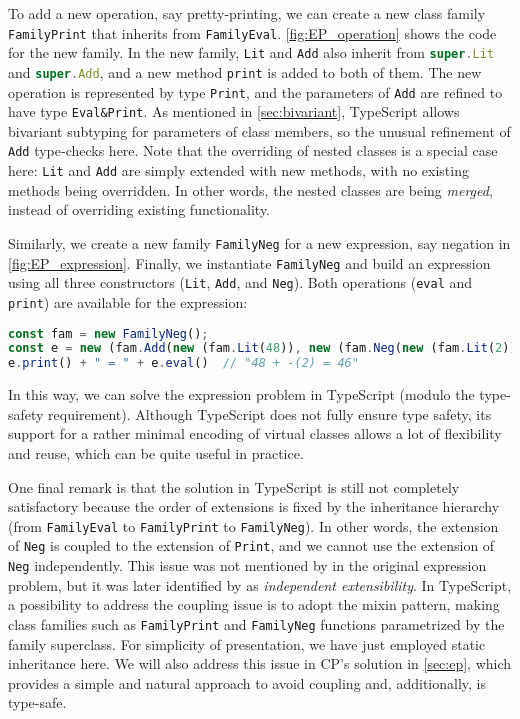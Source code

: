 To add a new operation, say pretty-printing, we can create a new class family
\lstinline{FamilyPrint} that inherits from \lstinline{FamilyEval}.
\autoref{fig:EP_operation} shows the code for the new family. In the new family,
\lstinline{Lit} and \lstinline{Add} also inherit from
\lstinline[language=TypeScript]{super.Lit} and
\lstinline[language=TypeScript]{super.Add}, and a new method \lstinline{print}
is added to both of them. The new operation is represented by type
\lstinline{Print}, and the parameters of \lstinline{Add} are refined to have
type \lstinline{Eval&Print}. As mentioned in \autoref{sec:bivariant}, TypeScript
allows bivariant subtyping for parameters of class members, so the unusual
refinement of \lstinline{Add} type-checks here. Note that the overriding of
nested classes is a special case here: \lstinline{Lit} and \lstinline{Add} are
simply extended with new methods, with no existing methods being overridden. In
other words, the nested classes are being \emph{merged}, instead of overriding
existing functionality.

Similarly, we create a new family \lstinline{FamilyNeg} for a new expression,
say negation in \autoref{fig:EP_expression}. Finally, we instantiate
\lstinline{FamilyNeg} and build an expression using all three constructors
(\lstinline{Lit}, \lstinline{Add}, and \lstinline{Neg}). Both operations
(\lstinline{eval} and \lstinline{print}) are available for the expression:
\begin{lstlisting}[language=TypeScript]
const fam = new FamilyNeg();
const e = new (fam.Add(new (fam.Lit(48)), new (fam.Neg(new (fam.Lit(2))))));
e.print() + " = " + e.eval()  // "48 + -(2) = 46"
\end{lstlisting}
In this way, we can solve the expression problem in TypeScript (modulo the
type-safety requirement). Although TypeScript does not fully ensure type safety,
its support for a rather minimal encoding of virtual classes allows a lot of
flexibility and reuse, which can be quite useful in practice.

One final remark is that the solution in TypeScript is still not completely
satisfactory because the order of extensions is fixed by the inheritance
hierarchy (from \lstinline{FamilyEval} to \lstinline{FamilyPrint} to
\lstinline{FamilyNeg}). In other words, the extension of \lstinline{Neg} is
coupled to the extension of \lstinline{Print}, and we cannot use the extension
of \lstinline{Neg} independently. This issue was not mentioned by
\citeauthor{wadler1998expression} in the original expression problem, but it was
later identified by \citet{zenger2005independently} as \emph{independent
extensibility}. In TypeScript, a possibility to address the coupling issue is to
adopt the mixin pattern, making class families such as \lstinline{FamilyPrint}
and \lstinline{FamilyNeg} functions parametrized by the family superclass. For
simplicity of presentation, we have just employed static inheritance here. We
will also address this issue in CP's solution in \autoref{sec:ep}, which
provides a simple and natural approach to avoid coupling and, additionally, is
type-safe.
